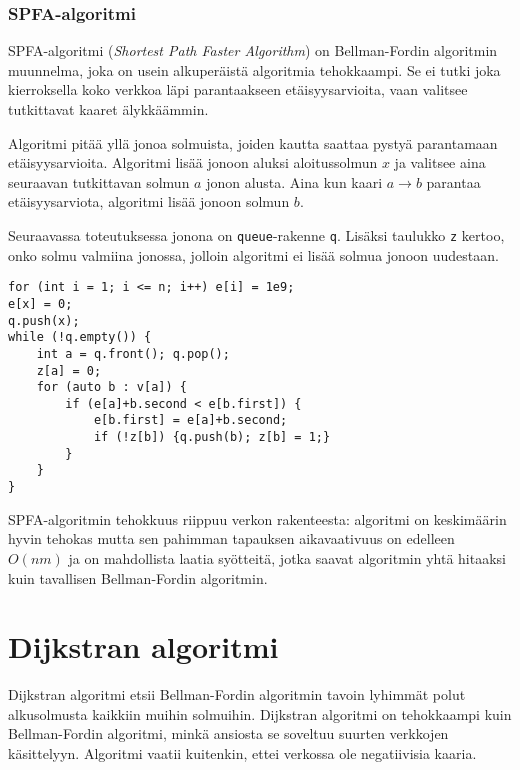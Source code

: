 \subsubsection{SPFA-algoritmi}


SPFA-algoritmi (\textit{Shortest Path Faster Algorithm})
on Bellman-Fordin algoritmin muunnelma,
joka on usein alkuperäistä algoritmia tehokkaampi.
Se ei tutki joka kierroksella koko verkkoa läpi
parantaakseen etäisyysarvioita, vaan valitsee
tutkittavat kaaret älykkäämmin.

Algoritmi pitää yllä jonoa solmuista,
joiden kautta saattaa pystyä parantamaan etäisyysarvioita.
Algoritmi lisää jonoon aluksi aloitussolmun $x$
ja valitsee aina seuraavan
tutkittavan solmun $a$ jonon alusta.
Aina kun kaari $a \rightarrow b$ parantaa
etäisyysarviota, algoritmi lisää jonoon solmun $b$.

Seuraavassa toteutuksessa jonona on \texttt{queue}-rakenne
\texttt{q}. Lisäksi taulukko \texttt{z} kertoo,
onko solmu valmiina jonossa, jolloin algoritmi ei
lisää solmua jonoon uudestaan.

\begin{lstlisting}
for (int i = 1; i <= n; i++) e[i] = 1e9;
e[x] = 0;
q.push(x);
while (!q.empty()) {
    int a = q.front(); q.pop();
    z[a] = 0;
    for (auto b : v[a]) {
        if (e[a]+b.second < e[b.first]) {
            e[b.first] = e[a]+b.second;
            if (!z[b]) {q.push(b); z[b] = 1;}
        }
    }
}
\end{lstlisting}

SPFA-algoritmin tehokkuus riippuu verkon rakenteesta:
algoritmi on keskimäärin hyvin tehokas mutta
sen pahimman tapauksen aikavaativuus on edelleen
$O(nm)$ ja on mahdollista
laatia syötteitä, jotka saavat algoritmin yhtä hitaaksi
kuin tavallisen Bellman-Fordin algoritmin.

\section{Dijkstran algoritmi}


Dijkstran algoritmi etsii Bellman-Fordin
algoritmin tavoin lyhimmät polut
alkusolmusta kaikkiin muihin solmuihin.
Dijkstran algoritmi on tehokkaampi kuin
Bellman-Fordin algoritmi,
minkä ansiosta se soveltuu suurten
verkkojen käsittelyyn.
Algoritmi vaatii kuitenkin,
ettei verkossa ole negatiivisia kaaria.

